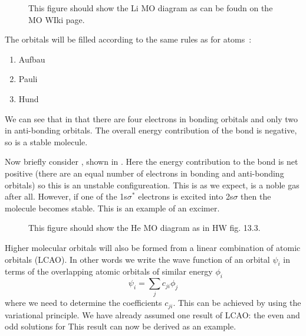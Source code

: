 \begin{figure}
  \caption{This figure should show the Li MO diagram as can be foudn on the MO
  WIki page.}
  \label{diaspec:fig:LiMO}
\end{figure}

The orbitals will be filled according to the same rules as for atoms~\cite{}:
%
\begin{enumerate}
    \item Aufbau
    \item Pauli
    \item Hund
\end{enumerate}
%
We can see that in  that there are four electrons in bonding orbitals
and only two in anti-bonding orbitals. The overall energy contribution of the
bond is negative, so   is a stable molecule.

Now briefly consider , shown in . Here the
energy contribution to the bond is net positive (there are an equal number of
electrons in bonding and anti-bonding orbitals) so this is an unstable
configureation. This is as we expect,  is a noble gas after all. However,
if one of the 1s$\sigma^*$ electrons is excited into 2s$\sigma$ then the
 molecule becomes stable. This is an example of an excimer.

\begin{figure}
  \caption{This figure should show the He MO diagram as in HW fig. 13.3.}
  \label{diaspec:fig:HeMO}
\end{figure}


Higher molecular orbitals will also be formed from a linear combination of
atomic orbitals (LCAO). In other words we write the wave function of an orbital
$\psi_i$ in terms of the overlapping atomic orbitals of similar energy $\phi_i$
%
\begin{equation}
  \psi_i = \sum_j c_{ji} \phi_j
\end{equation}
%
where we need to determine the coefficients $c_{ji}$. This can be achieved by
using the variational principle. We have already assumed one result of LCAO: the
even and odd solutions for   This result can now be
derived as an example.


